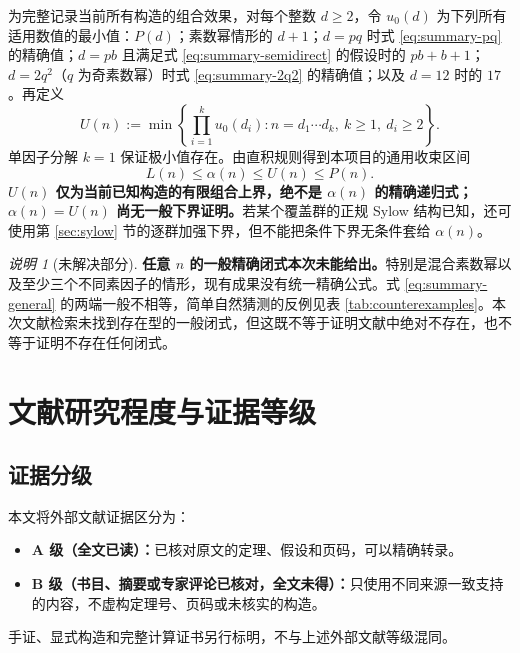 \documentclass[11pt,a4paper]{article}
\numberwithin{equation}{section}
\theoremstyle{plain}
\theoremstyle{definition}
\theoremstyle{remark}
\newtheorem{remark}[theorem]{说明}
\begin{document}
为完整记录当前所有构造的组合效果，对每个整数 $d\ge2$，令 $u_0(d)$ 为下列所有适用数值的最小值：$P(d)$；素数幂情形的 $d+1$；$d=pq$ 时式 \eqref{eq:summary-pq} 的精确值；$d=pb$ 且满足式 \eqref{eq:summary-semidirect} 的假设时的 $pb+b+1$；$d=2q^2$（$q$ 为奇素数幂）时式 \eqref{eq:summary-2q2} 的精确值；以及 $d=12$ 时的 $17$。再定义
\begin{equation}\label{eq:U-definition}
 U(n):=\min\left\{\prod_{i=1}^{k}u_0(d_i):
 n=d_1\cdots d_k,\ k\ge1,\ d_i\ge2\right\}.
\end{equation}
单因子分解 $k=1$ 保证极小值存在。由直积规则得到本项目的通用收束区间
\begin{equation}\label{eq:summary-general}
 \boxed{L(n)\le\alpha(n)\le U(n)\le P(n).}
\end{equation}
\textbf{$U(n)$ 仅为当前已知构造的有限组合上界，绝不是 $\alpha(n)$ 的精确递归式；$\alpha(n)=U(n)$ 尚无一般下界证明。}若某个覆盖群的正规 Sylow 结构已知，还可使用第 \ref{sec:sylow} 节的逐群加强下界，但不能把条件下界无条件套给 $\alpha(n)$。

\begin{remark}[未解决部分]
\textbf{任意 $n$ 的一般精确闭式本次未能给出。}特别是混合素数幂以及至少三个不同素因子的情形，现有成果没有统一精确公式。式 \eqref{eq:summary-general} 的两端一般不相等，简单自然猜测的反例见表 \ref{tab:counterexamples}。本次文献检索未找到存在型的一般闭式，但这既不等于证明文献中绝对不存在，也不等于证明不存在任何闭式。
\end{remark}

\section{文献研究程度与证据等级}
\subsection{证据分级}
本文将外部文献证据区分为：
\begin{itemize}[leftmargin=1.8em]
  \item \textbf{A 级（全文已读）：}已核对原文的定理、假设和页码，可以精确转录。
  \item \textbf{B 级（书目、摘要或专家评论已核对，全文未得）：}只使用不同来源一致支持的内容，不虚构定理号、页码或未核实的构造。
\end{itemize}
手证、显式构造和完整计算证书另行标明，不与上述外部文献等级混同。
\end{document}

